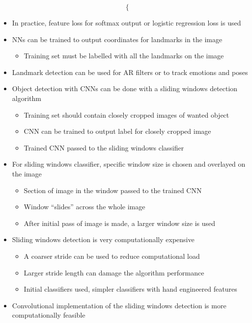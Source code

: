 \documentclass[12pt, letterpaper]{article}
\begin{document}
\begin{itemize}
$$\begin{cases}
        \end{cases}$$
        \item In practice, feature loss for softmax output or logistic regression loss is used
        \item NNs can be trained to output coordinates for landmarks in the image
        \begin{itemize}
            \item Training set must be labelled with all the landmarks on the image
        \end{itemize}
        \item Landmark detection can be used for AR filters or to track emotions and poses
        \item Object detection with CNNs can be done with a sliding windows detection algorithm
        \begin{itemize}
            \item Training set should contain closely cropped images of wanted object
            \item CNN can be trained to output label for closely cropped image
            \item Trained CNN passed to the sliding windows classifier
        \end{itemize}
        \item For sliding windows classifier, specific window size is chosen and overlayed on the image
        \begin{itemize}
            \item Section of image in the window passed to the trained CNN
            \item Window ``slides'' across the whole image 
            \item After initial pass of image is made, a larger window size is used
        \end{itemize}
        \item Sliding windows detection is very computationally expensive
        \begin{itemize}
            \item A coarser stride can be used to reduce computational load
            \item Larger stride length can damage the algorithm performance
            \item Initial classifiers used, simpler classifiers with hand engineered features
        \end{itemize}
        \item Convolutional implementation of the sliding windows detection is more computationally feasible

\end{itemize}
\end{document}
